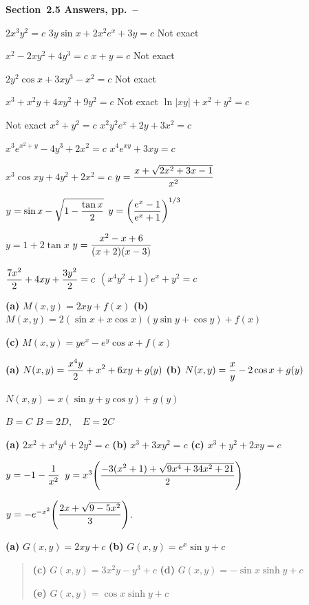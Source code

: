 {\bf Section~2.5 Answers,
pp.~\pageref{exer:2.5.1}--\pageref{exer:2.5.44}}\medskip

    $2x^{3}y^{2}=c$
    $3y\sin x+2x^{2}e^{x}+3y=c$
    Not exact

  $x^{2}-2xy^{2}+4y^{3}=c$
    $x+y=c$
   Not exact

   $2y^{2}\cos x+3xy^{3}-x^{2}=c$
   Not exact

   $x^{3}+x^{2}y+4xy^{2}+9y^{2}=c$
  Not exact
  $\ln|xy|+x^{2}+y^{2}=c$

  Not exact
   $x^{2}+y^{2}=c$
 $x^{2}y^{2}e^{x}+2y+3x^{2}=c$

  $x^{3}e^{x^{2}+y}-4y^{3}+2x^{2}=c$
  $x^{4}e^{xy}+3xy=c$

 $x^{3}\cos xy+4y^{2}+2x^{2}=c$
 $y=\displaystyle\frac{x+\sqrt{2x^{2}+3x-1}}{x^{2}}$

 $y=\sin x-\displaystyle{\sqrt{1-\frac{\tan x}{2}}}$
 $\displaystyle{y=\left(\frac{e^{x}-1}{e^{x}+1}\right)^{1/3}}$

  $y=1+2\tan x$
 $y=\displaystyle\frac{x^{2}-x+6}{(x+2)(x-3)}$

 $\displaystyle{\frac{7x^{2}}{2}+4xy+\frac{3y^{2}}{2}=c}$
  $(x^{4}y^{2}+1)e^{x}+y^{2}=c$

{\bf (a)} $M(x,y)=2xy+f(x)$  {\bf (b)}
 $M(x,y)=2(\sin x+x\cos x)
(y\sin y+\cos y)+f(x)$

\quad\;    {\bf (c)}
 $M(x,y)=ye^{x}-e^{y}\cos x+f(x)$

{\bf (a)}  $N(x,y)=\displaystyle\frac{x^{4}y}{2}+x^{2}+6xy+g(y)$
{\bf (b)} $N(x,y)=\displaystyle\frac{x}{y}-2\cos x+g(y)$

\quad{}   $N(x,y)=x(\sin y+y\cos y)+g(y)$

   $B=C$
   $B=2D,\quad E=2C$

{\bf (a)}  $2x^{2}+x^{4}y^{4}+2y^{2}=c$
{\bf (b)}  $x^{3}+3xy^{2}=c$
{\bf (c)}  $x^{3}+y^{2}+2xy=c$

 $y=-1-\displaystyle\frac{1}{x^{2}}$
$y=x^{3}\displaystyle{\left(\frac{-3(x^{2}+1)+\sqrt{9x^{4}+34x^{2}+21}}{2}\right)}$

 $y=-e^{-x^{2}}\displaystyle{\left(\frac{2x+\sqrt{9-5x^{2}}}{3}\right)}$.

{\bf (a)}  $G(x,y)=2xy+c$
{\bf (b)}  $G(x,y)=e^{x}\sin y+c$
\begin{quote}
{\bf (c)}  $G(x,y)=3x^{2}y-y^{3}+c$
{\bf (d)}  $G(x,y)=-\sin x\sinh y+c$

{\bf (e)}  $G(x,y)=\cos x\sinh y+c$
\end{quote}


